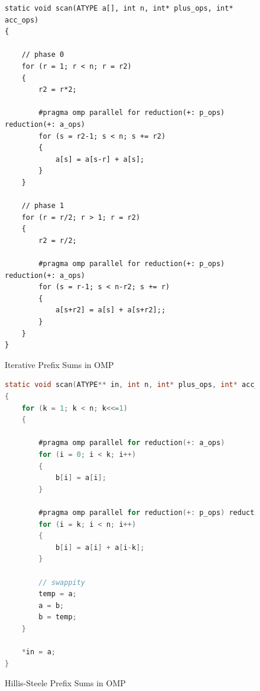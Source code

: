 \documentclass[12pt]{article}
\begin{document}
\begin{figure}[H]
\caption{Iterative Prefix Sums in OMP}

\begin{lstlisting}
static void scan(ATYPE a[], int n, int* plus_ops, int* acc_ops)
{

	// phase 0
	for (r = 1; r < n; r = r2)
	{
		r2 = r*2;

		#pragma omp parallel for reduction(+: p_ops) reduction(+: a_ops)
		for (s = r2-1; s < n; s += r2)
		{
			a[s] = a[s-r] + a[s];
		}
	}

	// phase 1
	for (r = r/2; r > 1; r = r2)
	{
		r2 = r/2;

		#pragma omp parallel for reduction(+: p_ops) reduction(+: a_ops)
		for (s = r-1; s < n-r2; s += r)
		{
			a[s+r2] = a[s] + a[s+r2];;
		}
	}
}
\end{lstlisting}
\label{omp_prefix_iterative_code}
\end{figure}


\begin{figure}[H]
\caption{Hillis-Steele Prefix Sums in OMP}

\begin{lstlisting}[language=C]
static void scan(ATYPE** in, int n, int* plus_ops, int* acc_ops)
{
	for (k = 1; k < n; k<<=1) 
	{

		#pragma omp parallel for reduction(+: a_ops)
		for (i = 0; i < k; i++)
		{
			b[i] = a[i];
		}

		#pragma omp parallel for reduction(+: p_ops) reduction(+: a_ops)
		for (i = k; i < n; i++)
		{
			b[i] = a[i] + a[i-k];
		}

		// swappity
		temp = a;
		a = b;
		b = temp;
	}

	*in = a;
}
\end{lstlisting}
\label{omp_prefix_hillis_steele_code}
\end{figure}
\end{document}
